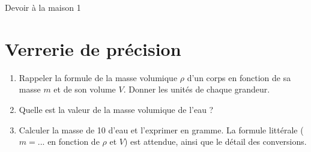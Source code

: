 



\begin{header}
Devoir à la maison 1
\normalsize
\flushleft
%
%
\end{header}


\noindent

\section{Verrerie de précision}

\begin{enumerate}
\item Rappeler la formule de la masse volumique $\rho$ d'un corps en fonction de sa masse $m$ et de son volume $V$.
Donner les unités de chaque grandeur.
\item Quelle est la valeur de la masse volumique de l'eau ?
\item Calculer la masse de \unit{10}{\milli\liter} d'eau et l'exprimer en gramme.
La formule littérale ($m=...$ en fonction de $\rho$ et $V$) est attendue, ainsi que le détail des conversions.
\label{quest:masse_10mL_eau}
\end{enumerate}

